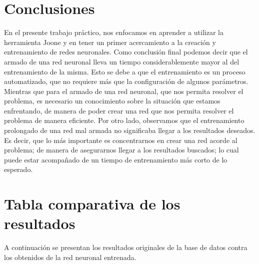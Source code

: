 \documentclass[12pt,titlepage]{article}
\begin{document}
\section{Conclusiones}
En el presente trabajo práctico, nos enfocamos en aprender a utilizar la herramienta Joone y en tener un primer acercamiento a la creaci\'on y entrenamiento de redes neuronales. Como conclusi\'on final podemos decir que el armado de una red neuronal lleva un tiempo considerablemente mayor al del entrenamiento de la misma. Esto se debe a que el entrenamiento es un proceso automatizado, que no requiere m\'as que la configuraci\'on de algunos par\'ametros. Mientras que para el armado de una red neuronal, que nos permita resolver el problema, es necesario un conocimiento sobre la situaci\'on que estamos enfrentando, de manera de poder crear una red que nos permita resolver el problema de manera eficiente. Por otro lado, observamos que el entrenamiento prolongado de una red mal armada no significaba llegar a los resultados deseados. Es decir, que lo m\'as importante es concentrarnos en crear una red acorde al problema; de manera de asegurarnos llegar a los resultados buscados; lo cual puede estar acompa\~nado de un tiempo de entrenamiento m\'as corto de lo esperado. \\

\appendix
\newpage
\section{Tabla comparativa de los resultados}
A continuaci\'on se presentan los resultados originales de la base de datos contra los obtenidos de la red neuronal entrenada.



\end{document}
